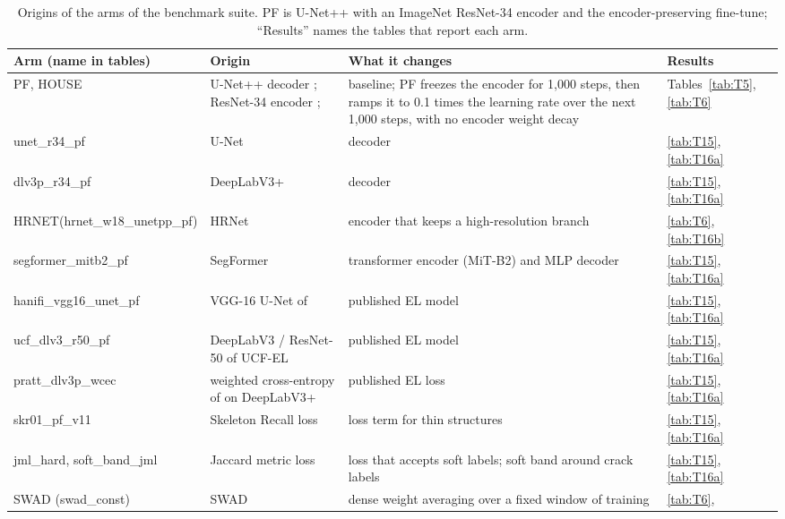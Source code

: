 \begin{table}[htbp]
\centering
\scriptsize
\caption{Origins of the arms of the benchmark suite. PF is U-Net++ with an ImageNet ResNet-34 encoder and the
encoder-preserving fine-tune; ``Results'' names the tables that report each arm.}
\label{tab:rw_arms}
\begin{tabular}{>{\raggedright}p{3.4cm} >{\raggedright}p{4.1cm} >{\raggedright}p{4.0cm} >{\raggedright\arraybackslash}p{2.2cm}}
\toprule
Arm (name in tables) & Origin & What it changes & Results \\
\midrule
PF, HOUSE & U-Net++ decoder \citep{zhou2018unetpp,zhou2020unetpp}; ResNet-34 encoder \citep{he2015resnet};
\citep{iakubovskii2019smp} & baseline; PF freezes the encoder for 1,000 steps, then ramps it to 0.1 times
the learning rate over the next 1,000 steps, with no encoder weight decay & Tables~\ref{tab:T5}, \ref{tab:T6} \\
unet\_r34\_pf & U-Net \citep{ronneberger2015unet} & decoder & \ref{tab:T15}, \ref{tab:T16a} \\
dlv3p\_r34\_pf & DeepLabV3+ \citep{chen2018deeplabv3plus} & decoder & \ref{tab:T15}, \ref{tab:T16a} \\
HRNET\newline (hrnet\_w18\_unetpp\_pf) & HRNet \citep{wang2021hrnet} & encoder that keeps a high-resolution branch &
\ref{tab:T6}, \ref{tab:T16b} \\
segformer\_mitb2\_pf & SegFormer \citep{xie2021segformer} & transformer encoder (MiT-B2) and MLP decoder &
\ref{tab:T15}, \ref{tab:T16a} \\
hanifi\_vgg16\_unet\_pf & VGG-16 U-Net of \citet{hanifi2025multiclass} & published EL model & \ref{tab:T15},
\ref{tab:T16a} \\
ucf\_dlv3\_r50\_pf & DeepLabV3 / ResNet-50 of UCF-EL \citep{fioresi2022ucfel} & published EL model & \ref{tab:T15},
\ref{tab:T16a} \\
pratt\_dlv3p\_wcec & weighted cross-entropy of \citet{pratt2023benchmark} on DeepLabV3+ & published EL loss &
\ref{tab:T15}, \ref{tab:T16a} \\
skr01\_pf\_v11 & Skeleton Recall loss \citep{kirchhoff2024skeletonrecall} & loss term for thin structures &
\ref{tab:T15}, \ref{tab:T16a} \\
jml\_hard, soft\_band\_jml & Jaccard metric loss \citep{wang2023jml} & loss that accepts soft labels; soft band around
crack labels & \ref{tab:T15}, \ref{tab:T16a} \\
SWAD (swad\_const) & SWAD \citep{cha2021swad} & dense weight averaging over a fixed window of training & \ref{tab:T6},

\end{tabular}
\end{table}

